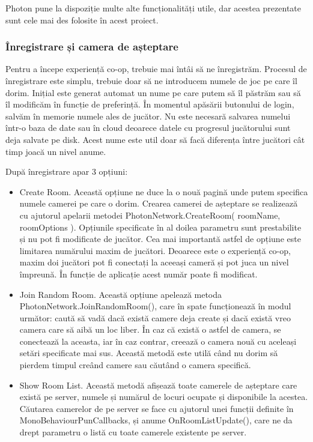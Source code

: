 \documentclass[12pt, a4paper]{article}
\begin{document}
	Photon pune la dispoziție multe alte funcționalități utile, dar acestea prezentate sunt cele mai des folosite în acest proiect.
	
	
	
	
	
	\subsubsection{Înregistrare și camera de așteptare}
	
	Pentru a începe experiență co-op, trebuie mai întâi să ne înregistrăm. Procesul de înregistrare este simplu, trebuie doar să ne introducem numele de joc pe care îl dorim. Inițial este generat automat un nume pe care putem să îl păstrăm sau să îl modificăm în funcție de preferință. În momentul apăsării butonului de login, salvăm în memorie numele ales de jucător. Nu este necesară salvarea numelui într-o baza de date sau în cloud deoarece datele cu progresul jucătorului sunt deja salvate pe disk. Acest nume este util doar să facă diferența între jucători cât timp joacă un nivel anume.
	\newline
	
	După înregistrare apar 3 opțiuni:
	
	\begin{itemize}
		\item Create Room. Această opțiune ne duce la o nouă pagină unde putem specifica numele camerei pe care o dorim. Crearea camerei de așteptare se realizează cu ajutorul apelarii metodei PhotonNetwork.CreateRoom( roomName, roomOptions ). Opțiunile specificate în al doilea parametru sunt prestabilite și nu pot fi modificate de jucător. Cea mai importantă astfel de opțiune este limitarea numărului maxim de jucători. Deoarece este o experiență co-op, maxim doi jucători pot fi conectați la aceeași cameră și pot juca un nivel împreună. În funcție de aplicație acest număr poate fi modificat.
		\item Join Random Room. Această opțiune apelează metoda PhotonNetwork.JoinRandomRoom(), care în spate funcționează în modul următor: caută să vadă dacă există camere deja create și dacă există vreo camera care să aibă un loc liber. În caz că există o astfel de camera, se conectează la aceasta, iar în caz contrar, creează o camera nouă cu aceleași setări specificate mai sus. Această metodă este utilă când nu dorim să pierdem timpul creând camere sau căutând o camera specifică.
		\item Show Room List. Această metodă afișează toate camerele de așteptare care există pe server, numele și numărul de locuri ocupate și disponibile la acestea. Căutarea camerelor de pe server se face cu ajutorul unei funcții definite în MonoBehaviourPunCallbacks, și anume OnRoomListUpdate(), care ne da drept parametru o listă cu toate camerele existente pe server.
	\end{itemize}
	
\end{document}
